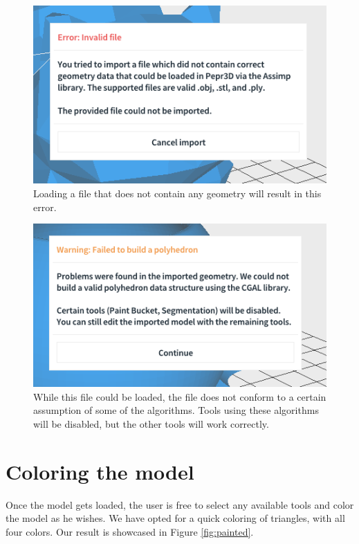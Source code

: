 \begin{figure}
	\centering
	\includegraphics[scale=0.9]{images/invalid_file.png}
	\caption{Loading a file that does not contain any geometry will result in this error.}
	\label{fig:invalidfile}
\end{figure}

\begin{figure}
	\centering
	\includegraphics[scale=0.9]{images/polyhedron_failed.png}
	\caption{While this file could be loaded, the file does not conform to a certain assumption of some of the algorithms. Tools using these algorithms will be disabled, but the other tools will work correctly.}
	\label{fig:polyhedronfailed}
\end{figure}

\section{Coloring the model}

Once the model gets loaded, the user is free to select any available tools and color the model as he wishes. We have opted for a quick coloring of triangles, with all four colors. Our result is showcased in Figure \ref{fig:painted}.

